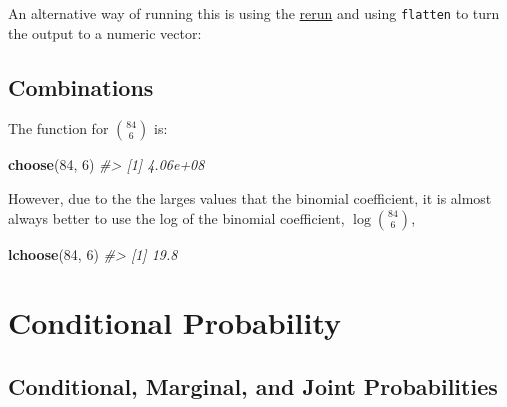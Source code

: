 \documentclass[]{book}
\newenvironment{Shaded}{\begin{snugshade}}{\end{snugshade}}
\newcommand{\CommentTok}[1]{\textcolor[rgb]{0.56,0.35,0.01}{\textit{#1}}}
\newcommand{\DecValTok}[1]{\textcolor[rgb]{0.00,0.00,0.81}{#1}}
\newcommand{\KeywordTok}[1]{\textcolor[rgb]{0.13,0.29,0.53}{\textbf{#1}}}
\newcommand{\NormalTok}[1]{#1}
\newcommand{\OperatorTok}[1]{\textcolor[rgb]{0.81,0.36,0.00}{\textbf{#1}}}
\newcommand{\StringTok}[1]{\textcolor[rgb]{0.31,0.60,0.02}{#1}}
\theoremstyle{definition}
\theoremstyle{definition}
\theoremstyle{definition}
\theoremstyle{remark}
\begin{document}
An alternative way of running this is using the
\href{https://www.rdocumentation.org/packages/purrr/topics/rerun}{rerun}
and using \texttt{flatten} to turn the output to a numeric vector:

\begin{Shaded}
\end{Shaded}

\hypertarget{combinations}{%
\subsection{Combinations}\label{combinations}}

The function for \(84\choose{6}\) is:

\begin{Shaded}
\begin{Highlighting}[]
\KeywordTok{choose}\NormalTok{(}\DecValTok{84}\NormalTok{, }\DecValTok{6}\NormalTok{)}
\CommentTok{#> [1] 4.06e+08}
\end{Highlighting}
\end{Shaded}

However, due to the the larges values that the binomial coefficient, it
is almost always better to use the log of the binomial coefficient,
\(\log{84\choose{6}}\),

\begin{Shaded}
\begin{Highlighting}[]
\KeywordTok{lchoose}\NormalTok{(}\DecValTok{84}\NormalTok{, }\DecValTok{6}\NormalTok{)}
\CommentTok{#> [1] 19.8}
\end{Highlighting}
\end{Shaded}

\hypertarget{conditional-probability}{%
\section{Conditional Probability}\label{conditional-probability}}

\hypertarget{conditional-marginal-and-joint-probabilities}{%
\subsection{Conditional, Marginal, and Joint
Probabilities}\label{conditional-marginal-and-joint-probabilities}}
\end{document}
